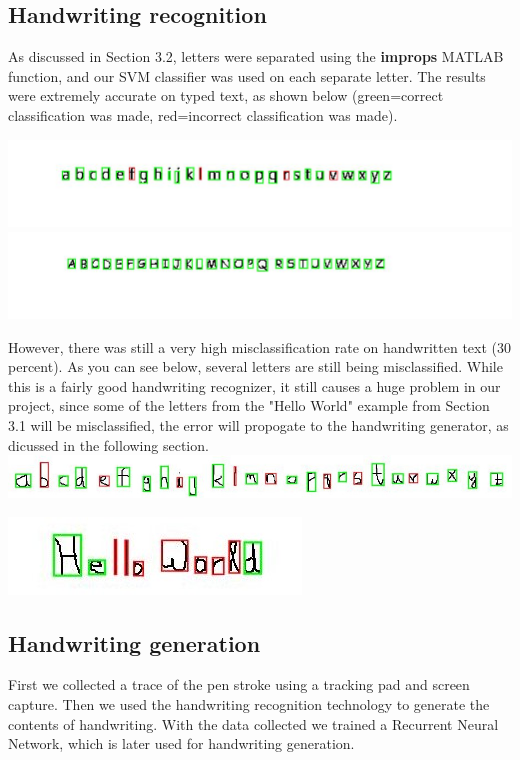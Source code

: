 \documentclass{article} %
\begin{document}
\subsection{Handwriting recognition}
As discussed in Section 3.2, letters were separated using the \textbf{improps} MATLAB function, and our SVM classifier was used on each separate letter. The results were extremely accurate on typed text, as shown below (green=correct classification was made, red=incorrect classification was made).
\begin{center}
\includegraphics[scale = 0.5]{alowerignore.jpg}
\includegraphics[scale = 0.5]{aupperignore.jpg}
\end{center}
However, there was still a very high misclassification rate on handwritten text (30 percent). As you can see below, several letters are still being misclassified. While this is a fairly good handwriting recognizer, it still causes a huge problem in our project, since some of the letters from the "Hello World" example from Section 3.1 will be misclassified, the error will propogate to the handwriting generator, as dicussed in the following section.
\includegraphics[scale = 0.5]{alowerwrittenignore.jpg}
\begin{center}
\includegraphics[scale = 0.5]{HelloWorldwrittenbox.jpg}
\end{center}
\subsection{Handwriting generation}
First we collected a trace of the pen stroke using a tracking pad and screen capture. Then we used the handwriting recognition technology to generate the contents of handwriting. With the data collected we trained a Recurrent Neural Network, which is later used for handwriting generation. 
\end{document}
